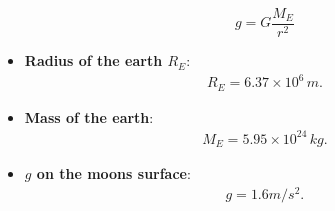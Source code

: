 \documentclass{report}
\begin{document}
\begin{itemize}
            \begin{equation}
                g = G \frac{M_E}{r^2}
            \end{equation}
        \item \textbf{Radius of the earth $R_{E}$}:
            \begin{align*}
                R_{E} = 6.37 \times 10^{6}\, m
            .\end{align*}
        \item \textbf{Mass of the earth}:
            \begin{align*}
                M_{E} = 5.95 \times 10^{24}\, kg
            .\end{align*}
        \item \textbf{$g$ on the moons surface}:
            \begin{align*}
                g = 1.6 m/s^{2}
            .\end{align*}
 

\end{itemize}
\end{document}

